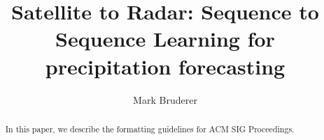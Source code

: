\documentclass[acmtog, authorversion]{acmart}
\begin{document}
\title{Satellite to Radar: Sequence to Sequence Learning for precipitation forecasting}


\author{Mark Bruderer}



\renewcommand{\shortauthors}{Author}

\begin{abstract}
  In this paper, we describe the formatting guidelines for ACM SIG Proceedings.
\end{abstract}

\end{document}
